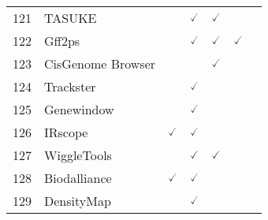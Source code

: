 \documentclass[10pt,letterpaper]{article}
\begin{document}
\begin{table}[!ht]
\begin{adjustwidth}{-2.25in}{0in}
\begin{tabular}{|c|l|c|c|c|c|c|}
121 & TASUKE\cite{kumagai2013tasuke} & & $\checked$ & $\checked$ & & \\ 
122 & Gff2ps\cite{abril2000gff2ps} & & $\checked$ & $\checked$ & $\checked$ & \\ 
123 & CisGenome Browser\cite{jiang2010cisgenome} & & & $\checked$ & & \\ 
124 & Trackster\cite{goecks2012ngs} & & $\checked$ & & &  \\ 
125 & Genewindow\cite{staats2005genewindow} & & $\checked$ & & &  \\ 
126 & IRscope\cite{amiryousefi2018irscope} & $\checked$ & $\checked$ & & & \\ 
127 & WiggleTools\cite{zerbino2013wiggletools} & & $\checked$ & $\checked$ & & \\ 
128 & Biodalliance\cite{down2011dalliance} & $\checked$ & $\checked$ & & & \\ 
129 & DensityMap\cite{guizard2016densitymap} & & $\checked$ & & &  \\ \hline
\end{tabular}
\label{table1}
\end{adjustwidth}
\end{table}
\end{document}
